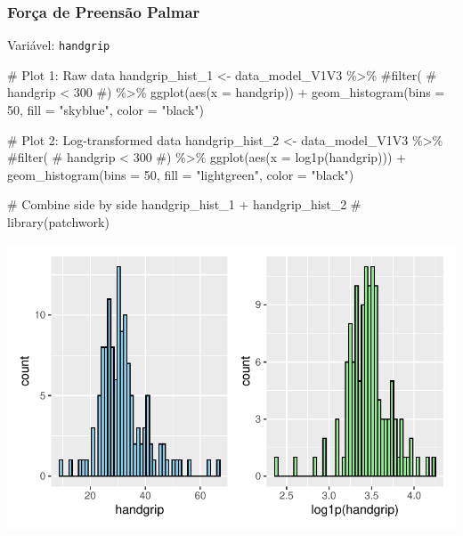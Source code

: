 \documentclass[
  12pt,
]{article}
\newenvironment{Shaded}{\begin{snugshade}}{\end{snugshade}}
\newcommand{\AttributeTok}[1]{\textcolor[rgb]{0.40,0.45,0.13}{#1}}
\newcommand{\CommentTok}[1]{\textcolor[rgb]{0.37,0.37,0.37}{#1}}
\newcommand{\DecValTok}[1]{\textcolor[rgb]{0.68,0.00,0.00}{#1}}
\newcommand{\FunctionTok}[1]{\textcolor[rgb]{0.28,0.35,0.67}{#1}}
\newcommand{\NormalTok}[1]{\textcolor[rgb]{0.00,0.23,0.31}{#1}}
\newcommand{\OtherTok}[1]{\textcolor[rgb]{0.00,0.23,0.31}{#1}}
\newcommand{\SpecialCharTok}[1]{\textcolor[rgb]{0.37,0.37,0.37}{#1}}
\newcommand{\StringTok}[1]{\textcolor[rgb]{0.13,0.47,0.30}{#1}}
\begin{document}
\subsubsection{Força de Preensão
Palmar}\label{foruxe7a-de-preensuxe3o-palmar}

Variável: \texttt{handgrip}

\begin{Shaded}
\begin{Highlighting}[]
\CommentTok{\# Plot 1: Raw data}
\NormalTok{handgrip\_hist\_1 }\OtherTok{\textless{}{-}}\NormalTok{ data\_model\_V1V3 }\SpecialCharTok{\%\textgreater{}\%} 
    \CommentTok{\#filter(}
    \CommentTok{\#    handgrip \textless{} 300}
    \CommentTok{\#) \%\textgreater{}\% }
    \FunctionTok{ggplot}\NormalTok{(}\FunctionTok{aes}\NormalTok{(}\AttributeTok{x =}\NormalTok{ handgrip)) }\SpecialCharTok{+} 
    \FunctionTok{geom\_histogram}\NormalTok{(}\AttributeTok{bins =} \DecValTok{50}\NormalTok{, }\AttributeTok{fill =} \StringTok{"skyblue"}\NormalTok{, }\AttributeTok{color =} \StringTok{"black"}\NormalTok{)}

\CommentTok{\# Plot 2: Log{-}transformed data}
\NormalTok{handgrip\_hist\_2 }\OtherTok{\textless{}{-}}\NormalTok{ data\_model\_V1V3 }\SpecialCharTok{\%\textgreater{}\%} 
    \CommentTok{\#filter(}
    \CommentTok{\#    handgrip \textless{} 300}
    \CommentTok{\#) \%\textgreater{}\%}
    \FunctionTok{ggplot}\NormalTok{(}\FunctionTok{aes}\NormalTok{(}\AttributeTok{x =} \FunctionTok{log1p}\NormalTok{(handgrip))) }\SpecialCharTok{+} 
    \FunctionTok{geom\_histogram}\NormalTok{(}\AttributeTok{bins =} \DecValTok{50}\NormalTok{, }\AttributeTok{fill =} \StringTok{"lightgreen"}\NormalTok{, }\AttributeTok{color =} \StringTok{"black"}\NormalTok{)}

\CommentTok{\# Combine side by side}
\NormalTok{handgrip\_hist\_1 }\SpecialCharTok{+}\NormalTok{ handgrip\_hist\_2 }\CommentTok{\# library(patchwork)}
\end{Highlighting}
\end{Shaded}

\includegraphics{Outcomes_files/figure-pdf/handgrip_1-1.pdf}
\end{document}
